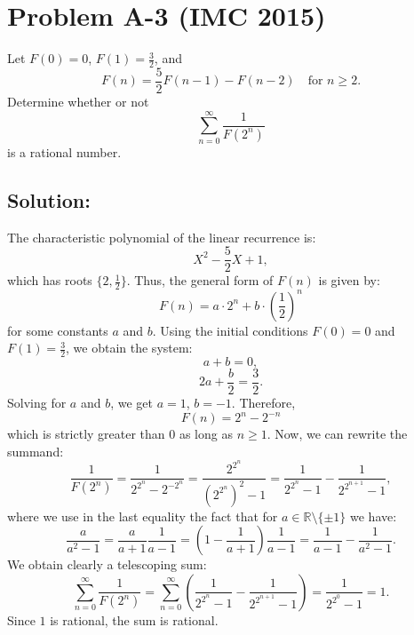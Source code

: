 \documentclass[11pt, a4paper, oneside]{article}
\newcommand{\problem}[1][]{\section{#1} \hfill \par}
\newcommand{\solution}[1][]{\subsection*{#1}\hfill \par}
\theoremstyle{remark}
\theoremstyle{lemma}
\begin{document}
\newpage
\problem[Problem A-3 (IMC 2015)] Let $F(0) = 0$, $F(1) =\frac{3}{2}$, and 
\[
F(n) = \frac{5}{2}F(n-1) - F(n-2) \quad \text{for } n \geq 2.
\]
Determine whether or not
\[
\sum_{n=0}^{\infty} \frac{1}{F(2^n)}
\]
is a rational number.

\solution[Solution:]
The characteristic polynomial of the linear recurrence is:
\[
X^2 - \frac{5}{2}X + 1,
\]
which has roots $\{2,\frac{1}{2}\}$. Thus, the general form of $F(n)$ is given by:
\[
F(n) = a \cdot 2^n + b \cdot \left(\frac{1}{2}\right)^n
\]
for some constants $a$ and $b$. Using the initial conditions $F(0) = 0$ and $F(1) = \frac{3}{2}$, we obtain the system:
\[
a + b = 0,
\]
\[
2a + \frac{b}{2} = \frac{3}{2}.
\]
Solving for $a$ and $b$, we get $a = 1$, $b = -1$. Therefore,
\[
F(n) = 2^n - 2^{-n}
\]
which is strictly greater than $0$ as long as $n\geq 1$.
Now, we can rewrite the summand:
\[
\frac{1}{F(2^n)} = \frac{1}{2^{2^n} - 2^{-2^n}} = \frac{2^{2^n}}{(2^{2^n})^2 - 1}=\frac{1}{2^{2^n} - 1} - \frac{1}{2^{2^{n+1}} - 1},
\]
where we use in the last equality the fact that for $a\in\mathbb{R}\setminus\{\pm 1\}$ we have: $$\frac{a}{a^2-1}=\frac{a}{a+1}\frac{1}{a-1}=\left(1-\frac{1}{a+1}\right)\frac{1}{a-1}=\frac{1}{a-1}-\frac{1}{a^2-1}.$$
We obtain clearly a telescoping sum:
\[
\sum_{n=0}^{\infty} \frac{1}{F(2^n)} = \sum_{n=0}^{\infty} \left( \frac{1}{2^{2^n} - 1} - \frac{1}{2^{2^{n+1}} - 1} \right) = \frac{1}{2^{2^0} - 1} = 1.
\]
Since $1$ is rational, the sum is rational.
\end{document}
